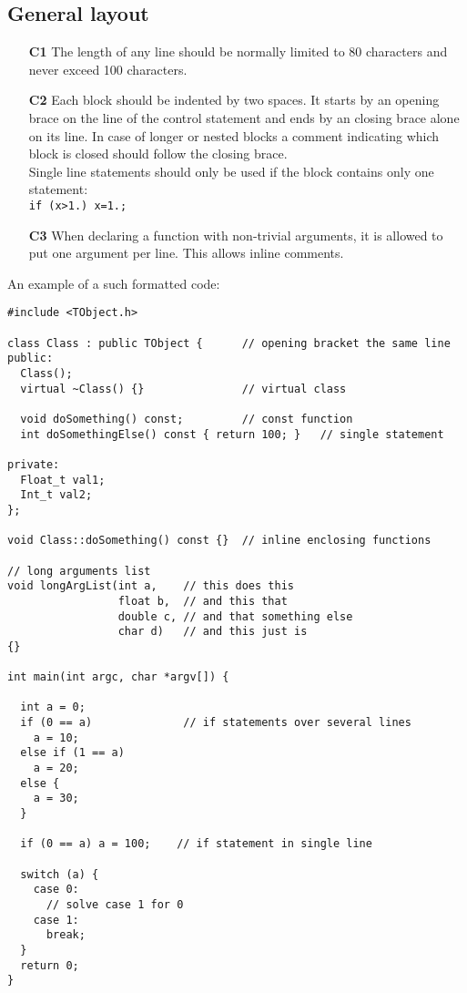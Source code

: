 \documentclass[a4paper,10pt]{article}
\begin{document}
\subsection{General layout}
\begin{itemize}
\item[\bf C1] The length of any line should be normally limited to 80 characters
  and never exceed 100 characters.
\item[\bf C2] Each block should be indented by two spaces. It starts by an opening
  brace on the line of the control statement and ends by an closing brace alone
  on its line. In case of longer or nested blocks a comment indicating which
  block is closed should follow the closing brace.\\
  Single line statements should only be used if the block contains only
  one statement:\\
  {\tt if (x>1.) x=1.;}
\item[\bf C3] When declaring a function with non-trivial arguments, it is
  allowed to put one argument per line. This allows inline comments.
\end{itemize}

An example of a such formatted code:
\begin{verbatim}
#include <TObject.h>

class Class : public TObject {      // opening bracket the same line
public:
  Class();
  virtual ~Class() {}               // virtual class

  void doSomething() const;         // const function
  int doSomethingElse() const { return 100; }   // single statement

private:
  Float_t val1;
  Int_t val2;
};

void Class::doSomething() const {}  // inline enclosing functions

// long arguments list
void longArgList(int a,    // this does this
                 float b,  // and this that
                 double c, // and that something else
                 char d)   // and this just is
{}

int main(int argc, char *argv[]) {

  int a = 0;
  if (0 == a)              // if statements over several lines
    a = 10;
  else if (1 == a)
    a = 20;
  else {
    a = 30;
  }

  if (0 == a) a = 100;    // if statement in single line

  switch (a) {
    case 0:
      // solve case 1 for 0
    case 1:
      break;
  }
  return 0;
}
\end{verbatim}
\end{document}
